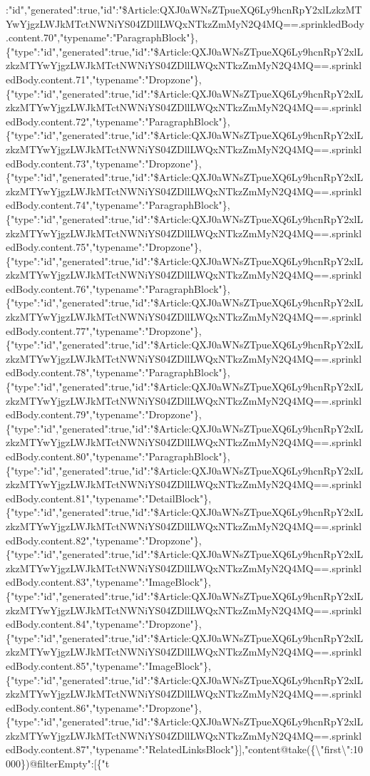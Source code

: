 :"id","generated":true,"id":"\$Article:QXJ0aWNsZTpueXQ6Ly9hcnRpY2xlLzkzMTYwYjgzLWJkMTctNWNiYS04ZDllLWQxNTkzZmMyN2Q4MQ==.sprinkledBody.content.70","typename":"ParagraphBlock"\},\{"type":"id","generated":true,"id":"\$Article:QXJ0aWNsZTpueXQ6Ly9hcnRpY2xlLzkzMTYwYjgzLWJkMTctNWNiYS04ZDllLWQxNTkzZmMyN2Q4MQ==.sprinkledBody.content.71","typename":"Dropzone"\},\{"type":"id","generated":true,"id":"\$Article:QXJ0aWNsZTpueXQ6Ly9hcnRpY2xlLzkzMTYwYjgzLWJkMTctNWNiYS04ZDllLWQxNTkzZmMyN2Q4MQ==.sprinkledBody.content.72","typename":"ParagraphBlock"\},\{"type":"id","generated":true,"id":"\$Article:QXJ0aWNsZTpueXQ6Ly9hcnRpY2xlLzkzMTYwYjgzLWJkMTctNWNiYS04ZDllLWQxNTkzZmMyN2Q4MQ==.sprinkledBody.content.73","typename":"Dropzone"\},\{"type":"id","generated":true,"id":"\$Article:QXJ0aWNsZTpueXQ6Ly9hcnRpY2xlLzkzMTYwYjgzLWJkMTctNWNiYS04ZDllLWQxNTkzZmMyN2Q4MQ==.sprinkledBody.content.74","typename":"ParagraphBlock"\},\{"type":"id","generated":true,"id":"\$Article:QXJ0aWNsZTpueXQ6Ly9hcnRpY2xlLzkzMTYwYjgzLWJkMTctNWNiYS04ZDllLWQxNTkzZmMyN2Q4MQ==.sprinkledBody.content.75","typename":"Dropzone"\},\{"type":"id","generated":true,"id":"\$Article:QXJ0aWNsZTpueXQ6Ly9hcnRpY2xlLzkzMTYwYjgzLWJkMTctNWNiYS04ZDllLWQxNTkzZmMyN2Q4MQ==.sprinkledBody.content.76","typename":"ParagraphBlock"\},\{"type":"id","generated":true,"id":"\$Article:QXJ0aWNsZTpueXQ6Ly9hcnRpY2xlLzkzMTYwYjgzLWJkMTctNWNiYS04ZDllLWQxNTkzZmMyN2Q4MQ==.sprinkledBody.content.77","typename":"Dropzone"\},\{"type":"id","generated":true,"id":"\$Article:QXJ0aWNsZTpueXQ6Ly9hcnRpY2xlLzkzMTYwYjgzLWJkMTctNWNiYS04ZDllLWQxNTkzZmMyN2Q4MQ==.sprinkledBody.content.78","typename":"ParagraphBlock"\},\{"type":"id","generated":true,"id":"\$Article:QXJ0aWNsZTpueXQ6Ly9hcnRpY2xlLzkzMTYwYjgzLWJkMTctNWNiYS04ZDllLWQxNTkzZmMyN2Q4MQ==.sprinkledBody.content.79","typename":"Dropzone"\},\{"type":"id","generated":true,"id":"\$Article:QXJ0aWNsZTpueXQ6Ly9hcnRpY2xlLzkzMTYwYjgzLWJkMTctNWNiYS04ZDllLWQxNTkzZmMyN2Q4MQ==.sprinkledBody.content.80","typename":"ParagraphBlock"\},\{"type":"id","generated":true,"id":"\$Article:QXJ0aWNsZTpueXQ6Ly9hcnRpY2xlLzkzMTYwYjgzLWJkMTctNWNiYS04ZDllLWQxNTkzZmMyN2Q4MQ==.sprinkledBody.content.81","typename":"DetailBlock"\},\{"type":"id","generated":true,"id":"\$Article:QXJ0aWNsZTpueXQ6Ly9hcnRpY2xlLzkzMTYwYjgzLWJkMTctNWNiYS04ZDllLWQxNTkzZmMyN2Q4MQ==.sprinkledBody.content.82","typename":"Dropzone"\},\{"type":"id","generated":true,"id":"\$Article:QXJ0aWNsZTpueXQ6Ly9hcnRpY2xlLzkzMTYwYjgzLWJkMTctNWNiYS04ZDllLWQxNTkzZmMyN2Q4MQ==.sprinkledBody.content.83","typename":"ImageBlock"\},\{"type":"id","generated":true,"id":"\$Article:QXJ0aWNsZTpueXQ6Ly9hcnRpY2xlLzkzMTYwYjgzLWJkMTctNWNiYS04ZDllLWQxNTkzZmMyN2Q4MQ==.sprinkledBody.content.84","typename":"Dropzone"\},\{"type":"id","generated":true,"id":"\$Article:QXJ0aWNsZTpueXQ6Ly9hcnRpY2xlLzkzMTYwYjgzLWJkMTctNWNiYS04ZDllLWQxNTkzZmMyN2Q4MQ==.sprinkledBody.content.85","typename":"ImageBlock"\},\{"type":"id","generated":true,"id":"\$Article:QXJ0aWNsZTpueXQ6Ly9hcnRpY2xlLzkzMTYwYjgzLWJkMTctNWNiYS04ZDllLWQxNTkzZmMyN2Q4MQ==.sprinkledBody.content.86","typename":"Dropzone"\},\{"type":"id","generated":true,"id":"\$Article:QXJ0aWNsZTpueXQ6Ly9hcnRpY2xlLzkzMTYwYjgzLWJkMTctNWNiYS04ZDllLWQxNTkzZmMyN2Q4MQ==.sprinkledBody.content.87","typename":"RelatedLinksBlock"\}{]},"content@take(\{\textbackslash{}"first\textbackslash{}":10000\})@filterEmpty":{[}\{"t